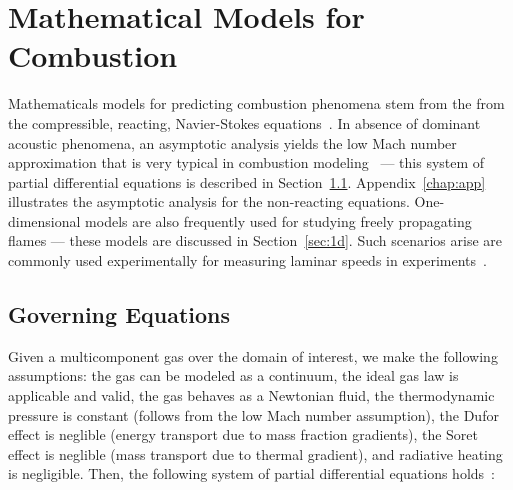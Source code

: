 \chapter{Mathematical Models for Combustion}\label{chap:model}

Mathematicals models for predicting combustion phenomena stem from the
from the compressible, reacting, Navier-Stokes equations~\cite{PoinsotVeynante3ed}. In absence
of dominant acoustic phenomena, an asymptotic analysis yields the low
Mach number approximation that is very typical in combustion
modeling~\cite{Muller,Codina,PoinsotVeynante3ed,Kuo} --- this system of partial differential equations is
described in Section~\ref{sec:lowmach}. Appendix~\ref{chap:app}
illustrates the asymptotic analysis for the non-reacting equations. One-dimensional models are
also frequently used for studying freely propagating flames --- these
models are discussed in Section~\ref{sec:1d}. Such
scenarios arise are commonly used experimentally for measuring laminar
speeds in experiments~\cite{}.

\section{Governing Equations}\label{sec:lowmach}

Given a multicomponent gas over the domain of interest, we make the
following assumptions: the gas can be modeled as a continuum, the
ideal gas law is applicable and valid, the gas behaves as a Newtonian
fluid, the thermodynamic pressure
is constant (follows from the low Mach number assumption), the Dufor
effect is neglible (energy transport due to mass fraction gradients),
the Soret effect is neglible (mass transport due to thermal
gradient), and radiative heating is negligible. Then, the following system of partial differential
equations holds~\cite{PoinsotVeynante3ed}:

